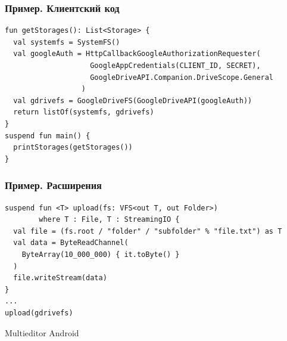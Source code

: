 \documentclass[14pt,aspectratio=169,hyperref={pdftex,unicode},xcolor=dvipsnames]{beamer}
\begin{document}
\begin{frame}[fragile]
\frametitle{Пример. Клиентский код}
\begin{verbatim}
fun getStorages(): List<Storage> {
  val systemfs = SystemFS()
  val googleAuth = HttpCallbackGoogleAuthorizationRequester(
                    GoogleAppCredentials(CLIENT_ID, SECRET), 
                    GoogleDriveAPI.Companion.DriveScope.General
                  )
  val gdrivefs = GoogleDriveFS(GoogleDriveAPI(googleAuth))
  return listOf(systemfs, gdrivefs)
}
suspend fun main() {
  printStorages(getStorages())
}
\end{verbatim}
\end{frame}

\begin{frame}[fragile]
\frametitle{Пример. Расширения}
\begin{verbatim}
suspend fun <T> upload(fs: VFS<out T, out Folder>)
        where T : File, T : StreamingIO {
  val file = (fs.root / "folder" / "subfolder" % "file.txt") as T
  val data = ByteReadChannel(
    ByteArray(10_000_000) { it.toByte() }
  )
  file.writeStream(data)
}
...
upload(gdrivefs)
\end{verbatim}
\end{frame}
  
\begin{frame}{Multieditor Android}
\end{frame}
\end{document}
